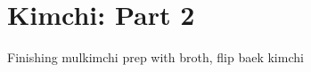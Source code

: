 \chapter*{Kimchi: Part 2}
\renewcommand{\chaptertitle}{Kimchi: Part 2}

Finishing mulkimchi prep with broth, flip baek kimchi
